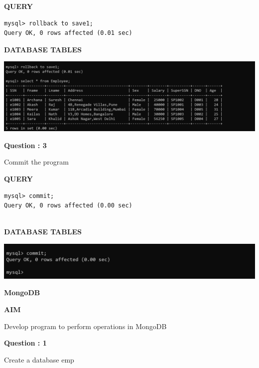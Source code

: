 \documentclass[a4paper,12pt]{report}
\begin{document}
\begin{flushleft}
\textbf{QUERY }
\end{flushleft}
 \begin{verbatim}
mysql> rollback to save1;
Query OK, 0 rows affected (0.01 sec)

\end{verbatim}
\begin{flushleft}
\textbf{DATABASE TABLES}
\end{flushleft}
\includegraphics[scale=0.35]{tcl3.png}
\begin{flushleft}
    \textbf{Question : 3}
\end{flushleft}
Commit the program

\begin{flushleft}
\textbf{QUERY }
\end{flushleft}
 \begin{verbatim}
mysql> commit;
Query OK, 0 rows affected (0.00 sec)


\end{verbatim}
\begin{flushleft}
\textbf{DATABASE TABLES}
\end{flushleft}

\includegraphics[scale=0.45]{tcl4.png}

\newpage
\begin{center}
\large\textbf{MongoDB}
\end{center}

\begin{flushleft}
\textbf{AIM }
\end{flushleft}
Develop program to perform operations in MongoDB

\begin{flushleft}
    \textbf{Question : 1}
\end{flushleft}
Create a database emp
\end{document}
